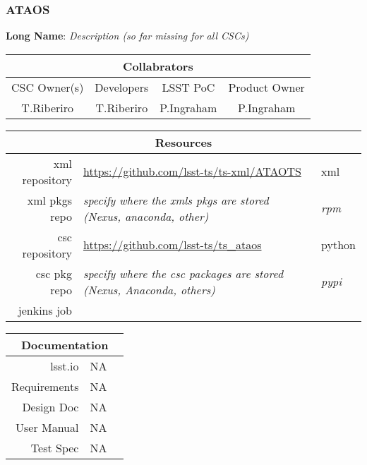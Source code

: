 \subsubsection{ATAOS}

\textbf{Long Name}: \textit{Description (so far missing for all CSCs)}

\begin{longtable}[]{cccc}
\hline
\multicolumn{4}{c}{Collabrators} \\ \hline
CSC Owner(s) & Developers & LSST PoC   & Product Owner \\ \hline
T.Riberiro   & T.Riberiro & P.Ingraham & P.Ingraham    \\ \hline
\end{longtable}

\begin{longtable}[]{rll}
\hline
\multicolumn{3}{c}{Resources} \\ \hline
xml repository & \url{https://github.com/lsst-ts/ts-xml/ATAOTS} & xml \\ \hline
xml pkgs repo  & \textit{specify where the xmls pkgs are stored (Nexus, anaconda, other)} & \textit{rpm} \\ \hline
csc repository & \url{https://github.com/lsst-ts/ts_ataos} & python \\ \hline
csc pkg repo   & \textit{specify where the csc packages are stored (Nexus, Anaconda, others)} & \textit{pypi}\\ \hline
\hline
jenkins job    & & \\ \hline
\end{longtable}

\begin{longtable}[]{rll}
\hline
\multicolumn{3}{c}{Documentation} \\ \hline
lsst.io & NA & \\ \hline
Requirements & NA & \\ \hline
Design Doc & NA & \\ \hline
User Manual & NA & \\ \hline
Test Spec & NA & \\ \hline
\end{longtable}
